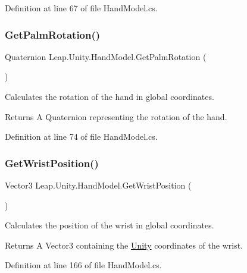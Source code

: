 Definition at line 67 of file Hand\+Model.\+cs.

\mbox{\label{class_leap_1_1_unity_1_1_hand_model_a5aa1271238fe3c0ef203b0150b84cf4c}} 
\subsubsection{\texorpdfstring{GetPalmRotation()}{GetPalmRotation()}}
{\footnotesize\ttfamily Quaternion Leap.\+Unity.\+Hand\+Model.\+Get\+Palm\+Rotation (\begin{DoxyParamCaption}{ }\end{DoxyParamCaption})}

Calculates the rotation of the hand in global coordinates. \begin{DoxyReturn}{Returns}
A Quaternion representing the rotation of the hand. 
\end{DoxyReturn}


Definition at line 74 of file Hand\+Model.\+cs.

\mbox{\label{class_leap_1_1_unity_1_1_hand_model_a095aedb3f03a32b782abaf1a22861588}} 
\subsubsection{\texorpdfstring{GetWristPosition()}{GetWristPosition()}}
{\footnotesize\ttfamily Vector3 Leap.\+Unity.\+Hand\+Model.\+Get\+Wrist\+Position (\begin{DoxyParamCaption}{ }\end{DoxyParamCaption})}

Calculates the position of the wrist in global coordinates. \begin{DoxyReturn}{Returns}
A Vector3 containing the \mbox{\hyperlink{namespace_leap_1_1_unity}{Unity}} coordinates of the wrist. 
\end{DoxyReturn}


Definition at line 166 of file Hand\+Model.\+cs.

\mbox{\label{class_leap_1_1_unity_1_1_hand_model_a67f1a6887e0803c96095a376fc1e6031}} 
